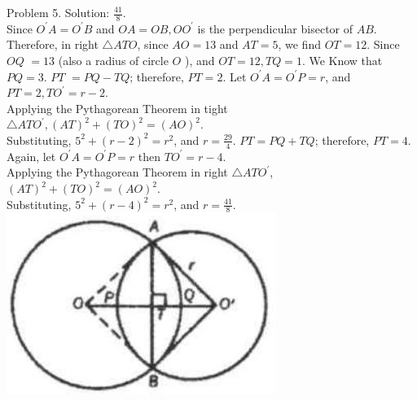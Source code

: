 \documentclass[10pt]{article}
\begin{document}
Problem 5. Solution: \(\frac{41}{8}\).\\
Since \(O^{\prime} A=O^{\prime} B\) and \(O A=O B, O O^{\prime}\) is the perpendicular bisector of \(A B\).\\
Therefore, in right \(\triangle A T O\), since \(A O=13\) and \(A T=5\), we find \(O T=12\). Since \(O Q\) \(=13\) (also a radius of circle \(O\) ), and \(O T=12, T Q=1\). We Know that \(P Q=3\). \(P T\) \(=P Q-T Q\); therefore, \(P T=2\). Let \(O^{\prime} A=O^{\prime} P=r\), and \(P T=2, T O^{\prime}=r-2\).\\
Applying the Pythagorean Theorem in tight \(\triangle A T O^{\prime},(A T)^{2}+(T O)^{2}=(A O)^{2}\).\\
Substituting, \(5^{2}+(r-2)^{2}=r^{2}\), and \(r=\frac{29}{4}\). \(P T=P Q+T Q\); therefore, \(P T=4\).\\
Again, let \(O^{\prime} A=O^{\prime} P=r\) then \(T O^{\prime}=r-4\).\\
Applying the Pythagorean Theorem in right \(\triangle A T O^{\prime}\),\\
\((A T)^{2}+(T O)^{2}=(A O)^{2}\).\\
Substituting, \(5^{2}+(r-4)^{2}=r^{2}\), and \(r=\frac{41}{8}\).\\
\includegraphics[max width=\textwidth, center]{2025_04_17_97bc1f7e44d93c271a88g-188(2)}
\end{document}
